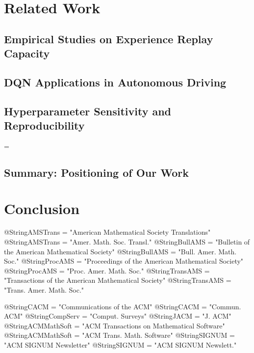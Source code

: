 \section{Related Work}
\subsection{Empirical Studies on Experience Replay Capacity}
\subsection{DQN Applications in Autonomous Driving}
\subsection{Hyperparameter Sensitivity and Reproducibility}
=\subsection{Summary: Positioning of Our Work}

\section{Conclusion}








 @String{AMSTrans = "American Mathematical Society Translations" }
 @String{AMSTrans = "Amer. Math. Soc. Transl." }
 @String{BullAMS = "Bulletin of the American Mathematical Society" }
 @String{BullAMS = "Bull. Amer. Math. Soc." }
 @String{ProcAMS = "Proceedings of the American Mathematical Society" }
 @String{ProcAMS = "Proc. Amer. Math. Soc." }
 @String{TransAMS = "Transactions of the American Mathematical Society" }
 @String{TransAMS = "Trans. Amer. Math. Soc." }

 @String{CACM = "Communications of the {ACM}" }
 @String{CACM = "Commun. {ACM}" }
 @String{CompServ = "Comput. Surveys" }
 @String{JACM = "J. ACM" }
 @String{ACMMathSoft = "{ACM} Transactions on Mathematical Software" }
 @String{ACMMathSoft = "{ACM} Trans. Math. Software" }
 @String{SIGNUM = "{ACM} {SIGNUM} Newsletter" }
 @String{SIGNUM = "{ACM} {SIGNUM} Newslett." }

